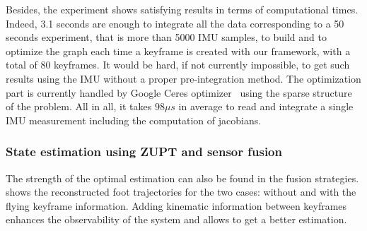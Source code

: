Besides, the experiment shows satisfying results in terms of computational times. Indeed, 3.1 seconds are enough to integrate all the data corresponding to a 50 seconds experiment, that is more than 5000 IMU samples, to build and to optimize the graph each time a keyframe is created with our framework,
with a total of 80 keyframes. It would be hard, if not currently impossible, to get such results using the IMU without a proper pre-integration method.
The optimization part is currently handled by Google Ceres optimizer~\cite{ceres-solver} using the sparse structure of the problem. All in all, it takes $98 \mu s$ in average to read and integrate a single IMU measurement including the computation of jacobians.

\subsubsection{State estimation using ZUPT and sensor fusion}

The strength of the optimal estimation can also be found in the fusion strategies. 
 shows the reconstructed foot trajectories for the two cases: without and with the flying keyframe information. Adding kinematic information between keyframes enhances the observability of the system and allows to get a better estimation.


